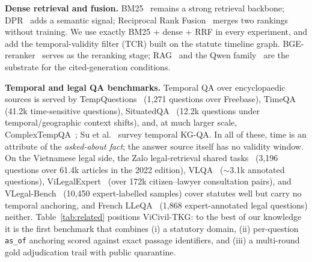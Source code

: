 \documentclass[10pt,a4paper,twocolumn]{article}
\newcommand{\code}[1]{\texttt{#1}}
\begin{document}
\textbf{Dense retrieval and fusion.} BM25~\cite{robertson2009bm25} remains a strong retrieval backbone; DPR~\cite{karpukhin2020dpr} adds a semantic signal; Reciprocal Rank Fusion~\cite{cormack2009rrf} merges two rankings without training. We use exactly BM25 + dense + RRF in every experiment, and add the temporal-validity filter (TCR) built on the statute timeline graph. BGE-reranker~\cite{xiao2024cpack} serves as the reranking stage; RAG~\cite{lewis2020rag} and the Qwen family~\cite{yang2024qwen25} are the substrate for the cited-generation conditions.

\textbf{Temporal and legal QA benchmarks.} Temporal QA over encyclopaedic sources is served by TempQuestions~\cite{jia2018tempquestions} (1{,}271 questions over Freebase), TimeQA~\cite{chen2021timeqa} (41.2k time-sensitive questions), SituatedQA~\cite{zhang2021situatedqa} (12.2k questions under temporal/geographic context shifts), and, at much larger scale, ComplexTempQA~\cite{gruber2025complextempqa}; Su et al.~\cite{su2024tkgqa} survey temporal KG-QA. In all of these, time is an attribute of the \emph{asked-about fact}; the answer source itself has no validity window. On the Vietnamese legal side, the Zalo legal-retrieval shared tasks~\cite{zalolegal2019} (3{,}196 questions over 61.4k articles in the 2022 edition), VLQA~\cite{vu2025vlqa} ($\sim$3.1k annotated questions), ViLegalExpert~\cite{vilegalexpert2026} (over 172k citizen--lawyer consultation pairs), and VLegal-Bench~\cite{vlegalbench2025} (10{,}450 expert-labelled samples) cover statutes well but carry no temporal anchoring, and French LLeQA~\cite{louis2024lleqa} (1{,}868 expert-annotated legal questions) neither. Table~\ref{tab:related} positions ViCivil-TKG: to the best of our knowledge it is the first benchmark that combines (i) a statutory domain, (ii) per-question \code{as\_of} anchoring scored against exact passage identifiers, and (iii) a multi-round gold adjudication trail with public quarantine.
\end{document}
